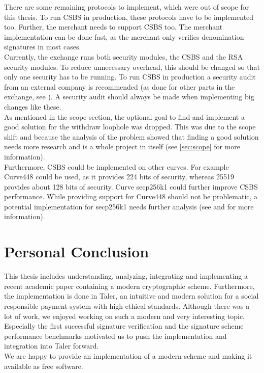 There are some remaining protocols to implement, which were out of scope for this thesis.
To run \gls{CSBS} in production, these protocols have to be implemented too.
Further, the merchant needs to support \gls{CSBS} too.
The merchant implementation can be done fast, as the merchant only verifies denomination signatures in most cases. \\
Currently, the exchange runs both security modules, the \gls{CSBS} and the RSA security modules.
To reduce unnecessary overhead, this should be changed so that only one security has to be running.
To run \gls{CSBS} in production a security audit from an external company is recommended (as done for other parts in the exchange, see \cite{codeblau:taler-audit}).
A security audit should always be made when implementing big changes like these.\\
As mentioned in the scope section, the optional goal to find and implement a good solution for the withdraw loophole was dropped.
This was due to the scope shift and because the analysis of the problem showed that finding a good solution needs more research and is a whole project in itself (see \ref{sec:scope} for more information).\\
Furthermore, \gls{CSBS} could be implemented on other curves.
For example Curve448 \cite{cryptoeprint:2015:625} could be used, as it provides 224 bits of security, whereas \gls{25519} \cite{bern:curve25519} provides about 128 bits of security.
Curve secp256k1 could further improve \gls{CSBS} performance.
While providing support for Curve448 should not be problematic, a potential implementation for secp256k1 needs further analysis (see \cite{bernlange:safecurves} and \cite{bip:schnorr-bitc} for more information).

\section{Personal Conclusion}
This thesis includes understanding, analyzing, integrating and implementing a recent academic paper \cite{cryptoeprint:2019:877} containing a modern cryptographic scheme.
Furthermore, the implementation is done in Taler, an intuitive and modern solution for a social responsible payment system with high ethical standards.
Although there was a lot of work, we enjoyed working on such a modern and very interesting topic.
Especially the first successful signature verification and the signature scheme performance benchmarks motivated us to push the implementation and integration into Taler forward.\\
We are happy to provide an implementation of a modern scheme and making it available as free software.
